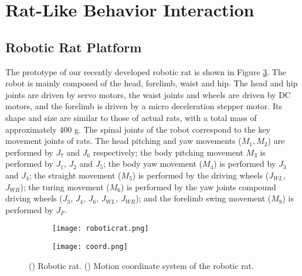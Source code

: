 \section{Rat-Like Behavior Interaction}
\subsection{Robotic Rat Platform}
The prototype of our recently developed robotic rat is shown in Figure \ref{figure:robot-system}. The robot is mainly composed of the head, forelimb, waist and hip. The head and hip joints are driven by servo motors, the waist joints and wheels are driven by DC motors, and the forelimb is driven by a micro deceleration stepper motor. Its shape and size are similar to those of actual rats, with a total mass of approximately 400 g. The spinal joints of the robot correspond to the key movement joints of rats. The head pitching and yaw movements ($M_1, M_2$) are performed by $J_7$ and $J_6$ respectively; the body pitching movement $M_3$ is performed by $J_1$, $J_2$ and $J_5$; the body yaw movement ($M_4$) is performed by $J_3$ and $J_4$; the straight movement ($M_5$) is performed by the driving wheels ($J_{WL}$, $J_{WR}$); the turing movement ($M_6$) is performed by the yaw joints compound driving wheels ($J_3$, $J_4$, $J_6$, $J_{WL}$, $J_{WR}$); and the forelimb swing movement ($M_8$) is performed by $J_F$.

\begin{figure}[h]
    \centering
    \begin{subfigure}{0.4\textwidth}
        \texttt{[image: roboticrat.png]}
        \caption{\label{figure:roboticrat}}
    \end{subfigure}
    \begin{subfigure}{0.5\textwidth}
        \texttt{[image: coord.png]}
        \caption{\label{figure:motion-coord}}
    \end{subfigure}
    \caption{() Robotic rat. () Motion coordinate system of the robotic rat.}
    \label{figure:robot-system}
\end{figure}

